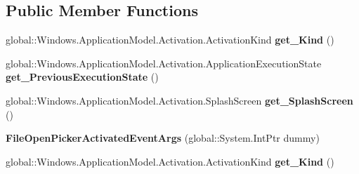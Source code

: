 \subsection*{Public Member Functions}
\begin{DoxyCompactItemize}
\item 
\mbox{\label{class_windows_1_1_application_model_1_1_activation_1_1_file_open_picker_activated_event_args_a217adc9bb6adcbb1bb9404e13b3d96cf}} 
global\+::\+Windows.\+Application\+Model.\+Activation.\+Activation\+Kind {\bfseries get\+\_\+\+Kind} ()
\item 
\mbox{\label{class_windows_1_1_application_model_1_1_activation_1_1_file_open_picker_activated_event_args_a537d05cdd2bcfaf1f9bf59bf89a23758}} 
global\+::\+Windows.\+Application\+Model.\+Activation.\+Application\+Execution\+State {\bfseries get\+\_\+\+Previous\+Execution\+State} ()
\item 
\mbox{\label{class_windows_1_1_application_model_1_1_activation_1_1_file_open_picker_activated_event_args_a3395084a778307a4f086d5f43330d8a9}} 
global\+::\+Windows.\+Application\+Model.\+Activation.\+Splash\+Screen {\bfseries get\+\_\+\+Splash\+Screen} ()
\item 
\mbox{\label{class_windows_1_1_application_model_1_1_activation_1_1_file_open_picker_activated_event_args_ae106dba9758a64d75cd44ac97ab3ff2f}} 
{\bfseries File\+Open\+Picker\+Activated\+Event\+Args} (global\+::\+System.\+Int\+Ptr dummy)
\item 
\mbox{\label{class_windows_1_1_application_model_1_1_activation_1_1_file_open_picker_activated_event_args_a217adc9bb6adcbb1bb9404e13b3d96cf}} 
global\+::\+Windows.\+Application\+Model.\+Activation.\+Activation\+Kind {\bfseries get\+\_\+\+Kind} ()
\item 
\mbox{\label{class_windows_1_1_application_model_1_1_activation_1_1_file_open_picker_activated_event_args_a537d05cdd2bcfaf1f9bf59bf89a23758}} 

\end{DoxyCompactItemize}
